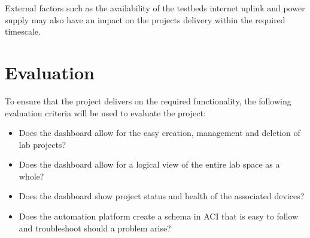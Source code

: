 External factors such as the availability of the testbeds internet uplink and power supply may also have an impact on the projects delivery within the required timescale.

\section{Evaluation}
\label{intro:evaluation}

To ensure that the project delivers on the required functionality, the following evaluation criteria will be used to evaluate the project:

\begin{itemize}
    \item Does the dashboard allow for the easy creation, management and deletion of lab projects?
    \item Does the dashboard allow for a logical view of the entire lab space as a whole?
    \item Does the dashboard show project status and health of the associated devices?
    \item Does the automation platform create a schema in ACI that is easy to follow and troubleshoot should a problem arise?
\end{itemize}
